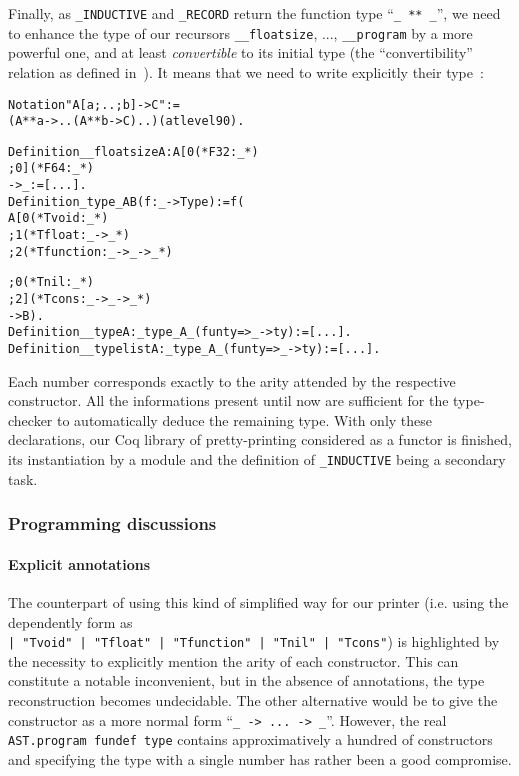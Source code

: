 \documentclass[a4paper, 11pt]{article}
\newenvironment{coq}
  {%
   \begin{alltt}
   \footnotesize} %% 8.3pl2 (April 2011)
  {\end{alltt} %
  }
\begin{document}
Finally, as \verb|_INDUCTIVE| and \verb|_RECORD| return the function type ``\verb|_ ** _|'', we need to enhance the type of our recursors \verb|__floatsize|, ..., \verb|__program| by a more powerful one, and at least \emph{convertible} to its initial type (the ``convertibility'' relation as defined in~\cite{Coq:manual}). It means that we need to write explicitly their type~:
\begin{coq}
  Notation "A [ a ; .. ; b ] -> C" := 
    (A ** a -> .. (A ** b -> C) ..) (at level 90).

Definition __floatsize {A} : A [ 0   (* F32       :           _ *)
                             ; 0 ] (* F64       :           _ *)
                           -> _ := [...].
Definition _type_ A B (f : _ -> Type) := f (
                           A [ 0   (* Tvoid     :           _ *)
                             ; 1   (* Tfloat    : _ ->      _ *)
                             ; 2   (* Tfunction : _ -> _ -> _ *)

                             ; 0   (* Tnil      :           _ *)
                             ; 2 ] (* Tcons     : _ -> _ -> _ *)
                           -> B).
Definition __type {A} : _type_ A _ (fun ty => _ -> ty) := [...].
Definition __typelist {A} : _type_ A _ (fun ty => _ -> ty) := [...].
\end{coq}
Each number corresponds exactly to the arity attended by the respective constructor.
All the informations present until now are sufficient for the type-checker to automatically deduce the remaining type. With only these declarations, our Coq library of pretty-printing considered as a functor is finished, its instantiation by a module and the definition of \verb|_INDUCTIVE| being a secondary task.
\subsubsection{Programming discussions}
\paragraph{Explicit annotations}
The counterpart of using this kind of simplified way for our printer (i.e. using the dependently form as \\ 
\verb_| "Tvoid" | "Tfloat" | "Tfunction" | "Tnil" | "Tcons"_) is highlighted by the necessity to explicitly mention the arity of each constructor. This can constitute a notable inconvenient, but in the absence of annotations, the type reconstruction becomes undecidable.
The other alternative would be to give the constructor as a more normal form ``\verb|_ -> ... -> _|''. However, the real \verb|AST.program fundef type| contains approximatively a hundred of constructors and specifying the type with a single number has rather been a good compromise.
\end{document}
